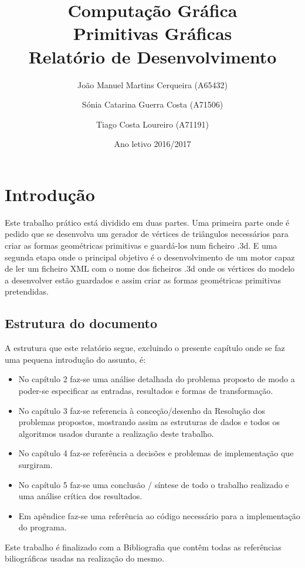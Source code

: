 \documentclass{report}
\title{Computa\c{c}\~ao Gr\'afica \\ \setlength{\baselineskip}{1.5\baselineskip} \textbf{Primitivas Gr\'aficas} \\ Relat\'orio de Desenvolvimento}
\author{ Jo\~ao Manuel Martins Cerqueira (A65432) \and S\'onia Catarina Guerra Costa (A71506) \and Tiago Costa Loureiro (A71191)}
\date{Ano letivo 2016/2017}
\begin{document}
\maketitle 

\tableofcontents


\chapter{Introdu\c{c}\~{a}o}
 
Este trabalho pr\'atico est\'a dividido em duas partes. Uma primeira parte onde \'e pedido que se desenvolva um gerador de v\'ertices de tri\^angulos necess\'arios para criar as formas geom\'etricas primitivas e guard\'a-los num ficheiro .3d. E uma segunda etapa onde o principal objetivo \'e o desenvolvimento de um motor capaz de ler um ficheiro XML com o nome dos ficheiros .3d onde os v\'ertices do modelo a desenvolver est\~ao guardados e assim criar as formas geom\'etricas primitivas pretendidas.

\section{Estrutura do documento}
A estrutura que este relat\'orio segue, excluindo o presente cap\'itulo onde se faz uma pequena introdu\c{c}\~{a}o do assunto, é: 
\begin{itemize}
\item No cap\'itulo 2 faz-se uma an\'alise detalhada do problema proposto de modo a poder-se especificar as entradas, resultados e formas de transforma\c{c}\~{a}o.
\item No cap\'itulo 3 faz-se referencia \`a conce\c{c}\~{a}o/desenho da Resolu\c{c}\~{a}o dos problemas propostos, mostrando assim as estruturas de dados e todos os algoritmos usados durante a realiza\c{c}\~{a}o deste trabalho.
\item No cap\'itulo 4 faz-se refer\^encia a decis\~{o}es e problemas de implementa\c{c}\~{a}o que surgiram. 
\item No cap\'itulo 5 faz-se uma conclus\~{a}o / s\'intese de todo o trabalho realizado e uma an\'alise cr\'itica dos resultados.
\item Em ap\^endice faz-se uma refer\^encia ao c\'odigo necess\'ario para a implementa\c{c}\~{a}o do programa.
\end{itemize}
Este trabalho \'e finalizado com a Bibliografia que cont\^em todas as refer\^encias biliogr\'aficas usadas na realiza\c{c}\~{a}o do mesmo.
\end{document}
